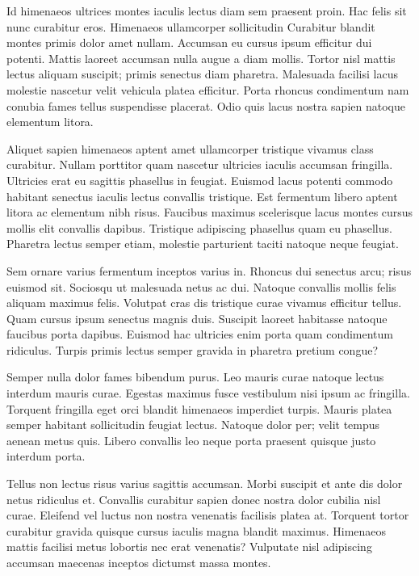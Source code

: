 \documentclass[final,3p,times,twocolumn]{elsarticle}
\begin{document}
Id himenaeos ultrices montes iaculis lectus diam sem praesent proin. Hac felis sit nunc curabitur eros. Himenaeos ullamcorper sollicitudin 
Curabitur blandit montes primis dolor amet nullam. Accumsan eu cursus ipsum efficitur dui potenti. Mattis laoreet accumsan nulla augue a diam mollis. Tortor nisl mattis lectus aliquam suscipit; primis senectus diam pharetra. Malesuada facilisi lacus molestie nascetur velit vehicula platea efficitur. Porta rhoncus condimentum nam conubia fames tellus suspendisse placerat. Odio quis lacus nostra sapien natoque elementum litora.

Aliquet sapien himenaeos aptent amet ullamcorper tristique vivamus class curabitur. Nullam porttitor quam nascetur ultricies iaculis accumsan fringilla. Ultricies erat eu sagittis phasellus in feugiat. Euismod lacus potenti commodo habitant senectus iaculis lectus convallis tristique. Est fermentum libero aptent litora ac elementum nibh risus. Faucibus maximus scelerisque lacus montes cursus mollis elit convallis dapibus. Tristique adipiscing phasellus quam eu phasellus. Pharetra lectus semper etiam, molestie parturient taciti natoque neque feugiat.

Sem ornare varius fermentum inceptos varius in. Rhoncus dui senectus arcu; risus euismod sit. Sociosqu ut malesuada netus ac dui. Natoque convallis mollis felis aliquam maximus felis. Volutpat cras dis tristique curae vivamus efficitur tellus. Quam cursus ipsum senectus magnis duis. Suscipit laoreet habitasse natoque faucibus porta dapibus. Euismod hac ultricies enim porta quam condimentum ridiculus. Turpis primis lectus semper gravida in pharetra pretium congue?

Semper nulla dolor fames bibendum purus. Leo mauris curae natoque lectus interdum mauris curae. Egestas maximus fusce vestibulum nisi ipsum ac fringilla. Torquent fringilla eget orci blandit himenaeos imperdiet turpis. Mauris platea semper habitant sollicitudin feugiat lectus. Natoque dolor per; velit tempus aenean metus quis. Libero convallis leo neque porta praesent quisque justo interdum porta.

Tellus non lectus risus varius sagittis accumsan. Morbi suscipit et ante dis dolor netus ridiculus et. Convallis curabitur sapien donec nostra dolor cubilia nisl curae. Eleifend vel luctus non nostra venenatis facilisis platea at. Torquent tortor curabitur gravida quisque cursus iaculis magna blandit maximus. Himenaeos mattis facilisi metus lobortis nec erat venenatis? Vulputate nisl adipiscing accumsan maecenas inceptos dictumst massa montes.
\end{document}
